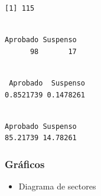 \documentclass[
  a4paper,
]{scrreport}
\newenvironment{Shaded}{\begin{snugshade}}{\end{snugshade}}
\newcommand{\CommentTok}[1]{\textcolor[rgb]{0.37,0.37,0.37}{#1}}
\newcommand{\DecValTok}[1]{\textcolor[rgb]{0.68,0.00,0.00}{#1}}
\newcommand{\FunctionTok}[1]{\textcolor[rgb]{0.28,0.35,0.67}{#1}}
\newcommand{\NormalTok}[1]{\textcolor[rgb]{0.00,0.23,0.31}{#1}}
\newcommand{\SpecialCharTok}[1]{\textcolor[rgb]{0.37,0.37,0.37}{#1}}
\providecommand{\tightlist}{%
  \setlength{\itemsep}{0pt}\setlength{\parskip}{0pt}}\usepackage{longtable,booktabs,array}
\theoremstyle{definition}
\theoremstyle{definition}
\theoremstyle{remark}
\begin{document}
\begin{verbatim}
[1] 115
\end{verbatim}

\begin{Shaded}
\end{Shaded}

\begin{verbatim}

Aprobado Suspenso 
      98       17 
\end{verbatim}

\begin{Shaded}
\end{Shaded}

\begin{verbatim}

 Aprobado  Suspenso 
0.8521739 0.1478261 
\end{verbatim}

\begin{Shaded}
\end{Shaded}

\begin{verbatim}

Aprobado Suspenso 
85.21739 14.78261 
\end{verbatim}

\hypertarget{gruxe1ficos-1}{%
\subsubsection{Gráficos}\label{gruxe1ficos-1}}

\begin{itemize}
\tightlist
\item
  Diagrama de sectores
\end{itemize}
\end{document}
